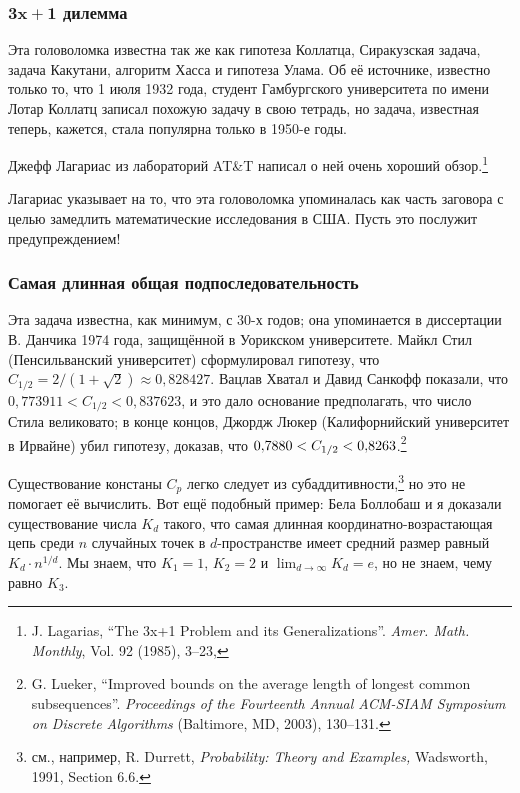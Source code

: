 \subsubsection*{$\bm{3x+1}$ дилемма}

Эта головоломка известна так же как гипотеза Коллатца, Сиракузская задача, задача Какутани, алгоритм Хасса и гипотеза Улама.
Об её источнике, известно только то, что 1 июля 1932 года, студент Гамбургского университета по имени Лотар Коллатц записал похожую задачу в свою тетрадь, но задача, известная теперь, кажется, стала популярна только в 1950-е годы.

Джефф Лагариас из лабораторий AT\&T написал о ней очень хороший обзор.\footnote{J. Lagarias, ``The 3x+1 Problem and its Generalizations''. \emph{Amer. Math. Monthly}, Vol. 92 (1985), 3--23,%
}

Лагариас указывает на то, что эта головоломка упоминалась как часть заговора с целью замедлить математические исследования в США.
Пусть это послужит предупреждением!

\subsubsection*{Самая длинная общая подпоследовательность}

Эта задача известна, как минимум, с 30-х годов;
она упоминается в диссертации В. Данчика 1974 года, защищённой в Уорикском университете.
Майкл Стил (Пенсильванский университет) сформулировал гипотезу, что $C_{1/2} = 2/(1+\sqrt{2})\approx 0{,}828427$.
Вацлав Хватал и Давид Санкофф показали, что $0{,}773911 < C_{1/2} < 0{,}837623$, и это дало основание предполагать, что число Стила великовато;
в конце концов, Джордж Люкер (Калифорнийский университет в Ирвайне) убил гипотезу, доказав, что $0{,}7880 \z< C_{1/2} \z< 0{,}8263$.\footnote{
G. Lueker, 
``Improved bounds on the average length of longest common subsequences''. \emph{Proceedings of the Fourteenth Annual ACM-SIAM Symposium on Discrete Algorithms} (Baltimore, MD, 2003), 130–131.}

Существование констаны $C_p$ легко следует из субаддитивности,\footnote{см., например, R. Durrett, \textit{Probability: Theory and Examples,} Wadsworth, 1991, Section 6.6.} но это не помогает её вычислить.
Вот ещё подобный пример: Бела Боллобаш и я доказали существование числа $K_d$ такого, что самая длинная координатно-возрастающая цепь среди $n$ случайных точек в $d$-пространстве имеет средний размер равный $K_d\cdot n^{1/d}$.
Мы знаем, что $K_1=1$, $K_2=2$ и $\lim_{d\to\infty} K_d=e$, но не знаем, чему равно $K_3$.

